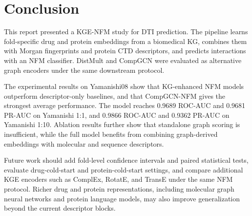 \section{Conclusion}
\label{sec:conclusion}

This report presented a KGE-NFM study for DTI prediction. The pipeline learns fold-specific drug and protein embeddings from a biomedical KG, combines them with Morgan fingerprints and protein CTD descriptors, and predicts interactions with an NFM classifier. DistMult and CompGCN were evaluated as alternative graph encoders under the same downstream protocol.

The experimental results on Yamanishi08 show that KG-enhanced NFM models outperform descriptor-only baselines, and that CompGCN-NFM gives the strongest average performance. The model reaches 0.9689 ROC-AUC and 0.9681 PR-AUC on Yamanishi 1:1, and 0.9866 ROC-AUC and 0.9362 PR-AUC on Yamanishi 1:10. Ablation results further show that standalone graph scoring is insufficient, while the full model benefits from combining graph-derived embeddings with molecular and sequence descriptors.

Future work should add fold-level confidence intervals and paired statistical tests, evaluate drug-cold-start and protein-cold-start settings, and compare additional KGE encoders such as ComplEx, RotatE, and TransE under the same NFM protocol. Richer drug and protein representations, including molecular graph neural networks and protein language models, may also improve generalization beyond the current descriptor blocks.
